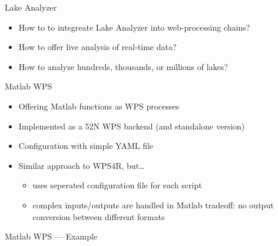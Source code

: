 \documentclass[xcolor=svgnames,professionalfonts,11pt,aspectratio=43,handout]{beamer}
\begin{document}
\begin{frame}[c]{Lake Analyzer}
  \begin{itemize}
    \item How to to integreate Lake Analyzer into web-processing chains?
    \pause
    \item How to offer live analysis of real-time data?
    \pause
    \item How to analyze hundreds, thousands, or millions of lakes?
  \end{itemize}
\end{frame}


\begin{frame}[t]{Matlab WPS}
  \begin{itemize}
    \item Offering Matlab functions as WPS processes
    \item Implemented as a 52\textdegree{}N WPS backend (and standalone version)
    \item Configuration with simple YAML file
    \item Similar approach to WPS4R, but\dots
    \begin{itemize}
      \item uses seperated configuration file for each script
      \item complex inputs/outputs are handled in Matlab
      \pause
      \arrow tradeoff: no output conversion between different formats
    \end{itemize}
  \end{itemize}
\end{frame}

\begin{frame}[fragile]{Matlab WPS --- Example}
  \begin{columns}
    
    \pause
    
    \pause
    
  \end{columns}
\end{frame}

%    
%    
%    
\end{document}
